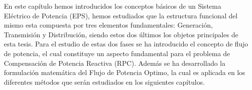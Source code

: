 
En este cap\'itulo hemos introducidos los conceptos b\'asicos de un Sistema El\'ectrico de Potencia (EPS), hemos estudiados que la estructura funcional del mismo esta compuesta por tres elementos fundamentales: Generaci\'on, Transmisi\'on y Distribuci\'on, siendo estos dos \'ultimos los objetos principales de esta tesis. Para el estudio de estas dos fases se ha introducido el concepto de flujo de potencia, el cual constituye un aspecto fundamental para el problema de Compensaci\'on de Potencia Reactiva (RPC). Adem\'as se ha desarrollado la formulaci\'on matem\'atica del Flujo de Potencia Optimo, la cual es aplicada en los diferentes m\'etodos que ser\'an estudiados en los siguientes cap\'itulos. 